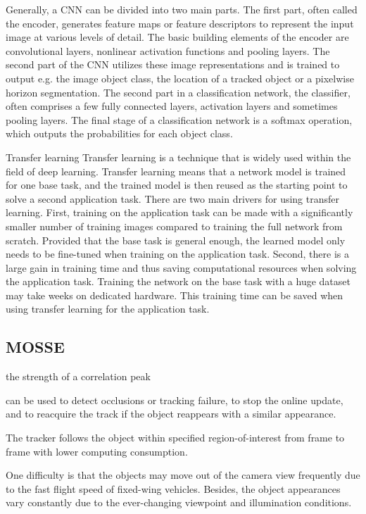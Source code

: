 \documentclass[a4paper]{report}
\begin{document}
Generally, a CNN can be divided into two main parts. The first part, often
called the encoder, generates feature maps or feature descriptors to represent
the input image at various levels of detail. The basic building elements of the
encoder are convolutional layers, nonlinear activation functions and pooling
layers. The second part of the CNN utilizes these image representations and is
trained to output e.g. the image object class, the location of a tracked object or
a pixelwise horizon segmentation. The second part in a classification network,
the classifier, often comprises a few fully connected layers, activation layers
and sometimes pooling layers. The final stage of a classification network is a
softmax operation, which outputs the probabilities for each object class.


Transfer learning
Transfer learning is a technique that is widely used within the field of deep learning. Transfer learning means that a network model is trained for one
base task, and the trained model is then reused as the starting point to solve
a second application task. There are two main drivers for using transfer learning.
First, training on the application task can be made with a significantly
smaller number of training images compared to training the full network from
scratch. Provided that the base task is general enough, the learned model only
needs to be fine-tuned when training on the application task. Second, there
is a large gain in training time and thus saving computational resources when
solving the application task. Training the network on the base task with a
huge dataset may take weeks on dedicated hardware. This training time can
be saved when using transfer learning for the application task.


\subsection{MOSSE}


the strength of a correlation peak

can be used to detect occlusions or tracking failure, to stop the online update, and to reacquire the track if the object reappears with a similar appearance.

The tracker follows the object within specified region-of-interest from
frame to frame with lower computing consumption.

One difficulty is that the objects may move out of the camera view frequently due to the fast flight speed of fixed-wing vehicles. Besides, the object appearances vary constantly due to the ever-changing viewpoint and illumination conditions.
\end{document}
